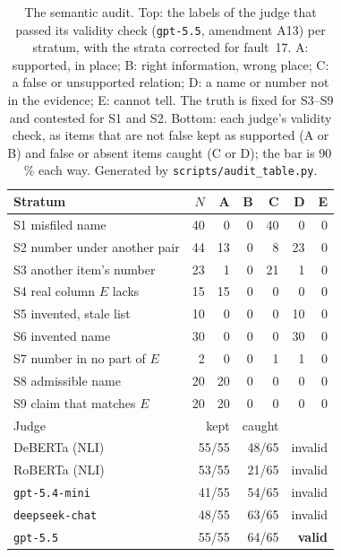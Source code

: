 \documentclass[10pt,twocolumn]{article}
\begin{document}
\begin{table}[!htbp]
\caption{The semantic audit. Top: the labels of the judge that passed its
validity check (\texttt{gpt-5.5}, amendment A13) per stratum, with the strata
corrected for fault~17. A: supported, in place; B: right information, wrong
place; C: a false or unsupported relation; D: a name or number not in the
evidence; E: cannot tell. The truth is fixed for S3--S9 and contested for S1
and S2. Bottom: each judge's validity check, as items that are not false kept
as supported (A or B) and false or absent items caught (C or D); the bar is
90\,\% each way. Generated by \texttt{scripts/audit\_table.py}.}
\label{tab:audit}
\centering
\footnotesize
\setlength{\tabcolsep}{3pt}
\begin{tabular}{@{}lrrrrrr@{}}
\toprule
Stratum & $N$ & A & B & C & D & E \\
\midrule
S1 misfiled name & 40 & 0 & 0 & 40 & 0 & 0 \\
S2 number under another pair & 44 & 13 & 0 & 8 & 23 & 0 \\
S3 another item's number & 23 & 1 & 0 & 21 & 1 & 0 \\
S4 real column $E$ lacks & 15 & 15 & 0 & 0 & 0 & 0 \\
S5 invented, stale list & 10 & 0 & 0 & 0 & 10 & 0 \\
S6 invented name & 30 & 0 & 0 & 0 & 30 & 0 \\
S7 number in no part of $E$ & 2 & 0 & 0 & 1 & 1 & 0 \\
S8 admissible name & 20 & 20 & 0 & 0 & 0 & 0 \\
S9 claim that matches $E$ & 20 & 20 & 0 & 0 & 0 & 0 \\
\midrule
Judge & \multicolumn{2}{r}{kept} & \multicolumn{2}{r}{caught} & \multicolumn{2}{r}{} \\
\midrule
DeBERTa (NLI) & \multicolumn{2}{r}{55/55} & \multicolumn{2}{r}{48/65} & \multicolumn{2}{r}{invalid} \\
RoBERTa (NLI) & \multicolumn{2}{r}{53/55} & \multicolumn{2}{r}{21/65} & \multicolumn{2}{r}{invalid} \\
\texttt{gpt-5.4-mini} & \multicolumn{2}{r}{41/55} & \multicolumn{2}{r}{54/65} & \multicolumn{2}{r}{invalid} \\
\texttt{deepseek-chat} & \multicolumn{2}{r}{48/55} & \multicolumn{2}{r}{63/65} & \multicolumn{2}{r}{invalid} \\
\texttt{gpt-5.5} & \multicolumn{2}{r}{55/55} & \multicolumn{2}{r}{64/65} & \multicolumn{2}{r}{\textbf{valid}} \\
\bottomrule
\end{tabular}
\end{table}
\end{document}
